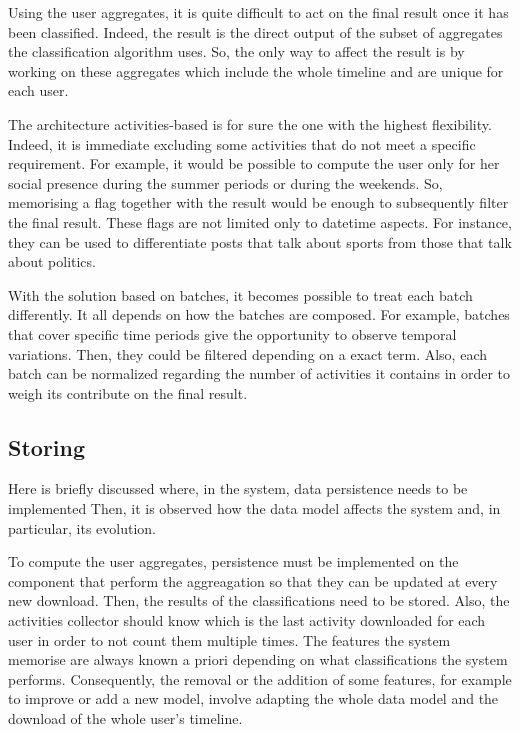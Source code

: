Using the user aggregates, it is quite difficult to act on the final result once it has been classified.
Indeed, the result is the direct output of the subset of aggregates the classification algorithm uses. So, the only way to affect the result is by working on these aggregates which include the whole timeline and are unique for each user.

The architecture activities-based is for sure the one with the highest flexibility. Indeed, it is immediate excluding some activities that do not meet a specific requirement.
For example, it would be possible to compute the user only for her social presence during the summer periods or during the weekends. 
So, memorising a flag together with the result would be enough to subsequently filter the final result.
These flags are not limited only to datetime aspects. For instance, they can be used to differentiate posts that talk about sports from those that talk about politics.

With the solution based on batches, it becomes possible to treat each batch differently. It all depends on how the batches are composed.
For example, batches that cover specific time periods give the opportunity to observe temporal variations. Then, they could be filtered depending on a exact term.
Also, each batch can be normalized regarding the number of activities it contains in order to weigh its contribute on the final result.


\subsection{Storing}
Here is briefly discussed where, in the system, data persistence needs to be implemented
Then, it is observed how the data model affects the system and, in particular, its evolution.

To compute the user aggregates, persistence must be implemented on the component that perform the aggreagation so that they can be updated at every new download.
Then, the results of the classifications need to be stored. Also, the activities collector should know which is the last activity downloaded for each user in order to not count them multiple times.
The features the system memorise are always known a priori depending on what classifications the system performs. Consequently, the removal or the addition of some features, for example to improve or add a new model, involve adapting the whole data model and the download of the whole user's timeline.

